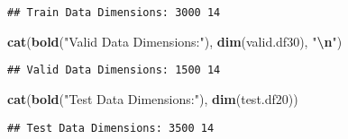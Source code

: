 \documentclass[
]{article}
\newenvironment{Shaded}{\begin{snugshade}}{\end{snugshade}}
\newcommand{\FunctionTok}[1]{\textcolor[rgb]{0.13,0.29,0.53}{\textbf{#1}}}
\newcommand{\NormalTok}[1]{#1}
\newcommand{\SpecialCharTok}[1]{\textcolor[rgb]{0.81,0.36,0.00}{\textbf{#1}}}
\newcommand{\StringTok}[1]{\textcolor[rgb]{0.31,0.60,0.02}{#1}}
\begin{document}
\begin{verbatim}
## Train Data Dimensions: 3000 14
\end{verbatim}

\begin{Shaded}
\begin{Highlighting}[]
\FunctionTok{cat}\NormalTok{(}\FunctionTok{bold}\NormalTok{(}\StringTok{"Valid Data Dimensions:"}\NormalTok{), }\FunctionTok{dim}\NormalTok{(valid.df30), }\StringTok{"}\SpecialCharTok{\textbackslash{}n}\StringTok{"}\NormalTok{)}
\end{Highlighting}
\end{Shaded}

\begin{verbatim}
## Valid Data Dimensions: 1500 14
\end{verbatim}

\begin{Shaded}
\begin{Highlighting}[]
\FunctionTok{cat}\NormalTok{(}\FunctionTok{bold}\NormalTok{(}\StringTok{"Test Data Dimensions:"}\NormalTok{), }\FunctionTok{dim}\NormalTok{(test.df20))}
\end{Highlighting}
\end{Shaded}

\begin{verbatim}
## Test Data Dimensions: 3500 14
\end{verbatim}
\end{document}
